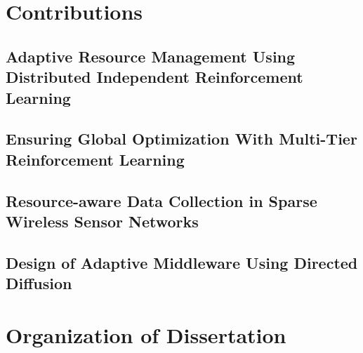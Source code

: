 \section{Contributions}
\label{contributions}
\subsection{Adaptive Resource Management Using Distributed Independent Reinforcement Learning}\label{intro:dirl}

\subsection{Ensuring Global Optimization With Multi-Tier Reinforcement Learning}\label{intro:coin}

\subsection{Resource-aware Data Collection in Sparse Wireless Sensor Networks}\label{intro:dirl-sparse}

\subsection{Design of Adaptive Middleware Using Directed Diffusion}\label{intro:diffusion}
%
\section{Organization of Dissertation}\label{organization}
